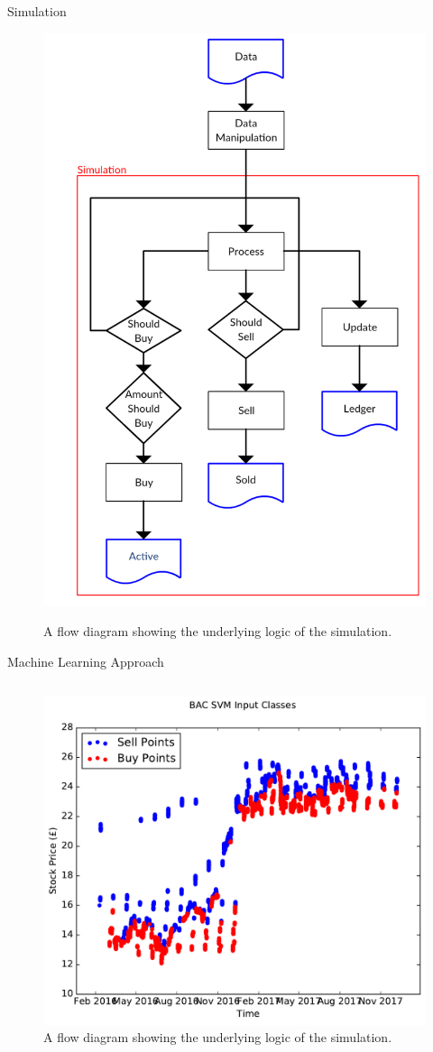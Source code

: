 \documentclass[final]{beamer}
\begin{document}
\begin{frame}{}
\begin{columns}[t]
\begin{column}{.48\linewidth}
        
        \begin{block}{Simulation}
        \begin{figure}
        \centering
		\includegraphics[width=0.4\columnwidth]{simFlow.pdf}
		\label{fig: SimFlow}
		\caption{A flow diagram showing the underlying logic of the simulation.}
		\end{figure}
        \end{block}
        
        
        \begin{block}{Machine Learning Approach}
         
         \begin{columns}[t]
         
         \begin{column}{0.48\linewidth}
         
         \begin{figure}
         \centering
		\includegraphics[width=0.95\columnwidth]{SVMBuyPoints.pdf}
		\caption{A flow diagram showing the underlying logic of the simulation.}
		\label{fig: SVMDataInput}
		\end{figure}
         

\end{column}
\end{columns}
\end{block}
\end{column}
\end{columns}
\end{frame}
\end{document}
